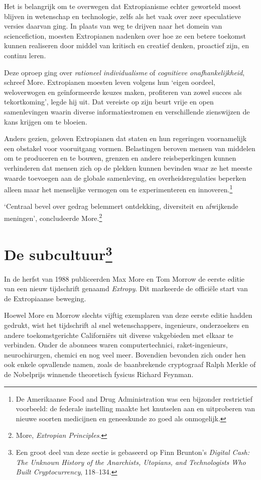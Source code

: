 \documentclass[
  a5paper,
  smalldemyvopaper,11pt,twoside,onecolumn,openright,extrafontsizes,
hidelinks]{memoir}
\begin{document}
Het is belangrijk om te overwegen dat Extropianisme echter geworteld
moest blijven in wetenschap en technologie, zelfs als het vaak over zeer
speculatieve versies daarvan ging. In plaats van weg te drijven naar het
domein van sciencefiction, moesten Extropianen nadenken over hoe ze een
betere toekomst kunnen realiseren door middel van kritisch en creatief
denken, proactief zijn, en continu leren.

Deze oproep ging over \emph{rationeel individualisme} of
\emph{cognitieve onafhankelijkheid}, schreef More. Extropianen moesten
leven volgens hun `eigen oordeel, weloverwogen en geïnformeerde keuzes
maken, profiteren van zowel succes als tekortkoming', legde hij uit. Dat
vereiste op zijn beurt vrije en open samenlevingen waarin diverse
informatiestromen en verschillende zienswijzen de kans krijgen om te
bloeien.

Anders gezien, geloven Extropianen dat staten en hun regeringen
voornamelijk een obstakel voor vooruitgang vormen. Belastingen beroven
mensen van middelen om te produceren en te bouwen, grenzen en andere
reisbeperkingen kunnen verhinderen dat mensen zich op de plekken kunnen
bevinden waar ze het meeste waarde toevoegen aan de globale samenleving,
en overheidsregulaties beperken alleen maar het menselijke vermogen om
te experimenteren en innoveren.\footnote{De Amerikaanse Food and Drug
  Administration was een bijzonder restrictief voorbeeld: de federale
  instelling maakte het knutselen aan en uitproberen van nieuwe soorten
  medicijnen en geneeskunde zo goed als onmogelijk.}

`Centraal bevel over gedrag belemmert ontdekking, diversiteit en
afwijkende meningen', concludeerde More.\footnote{More, \emph{Extropian
  Principles}.}

\section[De subcultuur]{\texorpdfstring{De
subcultuur\footnote{Een groot deel van deze sectie is gebaseerd op Finn
  Brunton's \emph{Digital Cash: The Unknown History of the Anarchists,
  Utopians, and Technologists Who Built Cryptocurrency}, 118--134.}}{De subcultuur}}\label{de-subcultuur131}

In de herfst van 1988 publiceerden Max More en Tom Morrow de eerste
editie van een nieuw tijdschrift genaamd \emph{Extropy}. Dit markeerde
de officiële start van de Extropiaanse beweging.

Hoewel More en Morrow slechts vijftig exemplaren van deze eerste editie
hadden gedrukt, wist het tijdschrift al snel wetenschappers, ingenieurs,
onderzoekers en andere toekomstgerichte Californiërs uit diverse
vakgebieden met elkaar te verbinden. Onder de abonnees waren
computertechnici, raket-ingenieurs, neurochirurgen, chemici en nog veel
meer. Bovendien bevonden zich onder hen ook enkele opvallende namen,
zoals de baanbrekende cryptograaf Ralph Merkle of de Nobelprijs winnende
theoretisch fysicus Richard Feynman.
\end{document}
